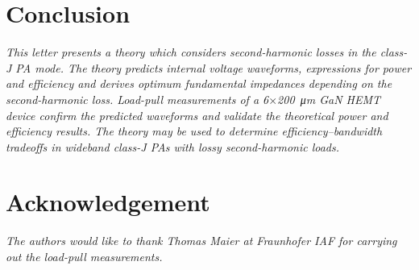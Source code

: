\documentclass[journal]{IEEEtran}
\begin{document}
\section{Conclusion}
\label{sec:conclusion}
{\itshape
This letter presents a theory which considers second-harmonic losses in the
class-J PA mode. The theory predicts internal voltage waveforms, expressions
for power and efficiency and derives optimum fundamental impedances depending
on the second-harmonic loss. Load-pull measurements of a
6$\times$\SI{200}{\micro\meter} GaN HEMT device confirm the predicted waveforms
and validate the theoretical power and efficiency results. The theory may be
used to determine efficiency--bandwidth tradeoffs in wideband class-J PAs with
lossy second-harmonic loads.

}

\section*{Acknowledgement}
{\itshape
The authors would like to thank Thomas Maier at Fraunhofer IAF for carrying out
the load-pull measurements.
}


%
%
\end{document}
